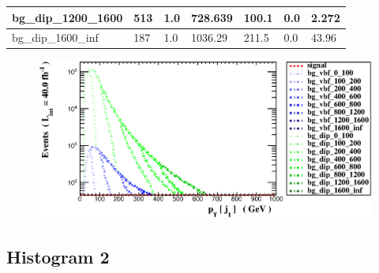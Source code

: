 \documentclass[a4paper, 10pt]{article}
\begin{document}
\begin{table}[H]
\begin{center}
\begin{tabular}{|m{23.0mm}|m{23.0mm}|m{18.0mm}|m{19.0mm}|m{19.0mm}|m{19.0mm}|m{19.0mm}|}
      \hline
      {\cellcolor{white}         bg\_dip\_1200\_1600}& {\cellcolor{white}         513}& {\cellcolor{white}         1.0}& {\cellcolor{white}         728.639}& {\cellcolor{white}         100.1}& {\cellcolor{green}         0.0}& {\cellcolor{green}         2.272}\\
      \hline
      {\cellcolor{white}         bg\_dip\_1600\_inf}& {\cellcolor{white}         187}& {\cellcolor{white}         1.0}& {\cellcolor{white}         1036.29}& {\cellcolor{white}         211.5}& {\cellcolor{red}         0.0}& {\cellcolor{red}         43.96}\\
\hline
    \end{tabular}
  \end{center}
\end{table}

\begin{figure}[H]
  \begin{center}
    \includegraphics[scale=0.45]{selection_0.eps}\\
\caption{   }
  \end{center}
\end{figure}
      \newpage
\subsection{ Histogram 2}
\end{document}
